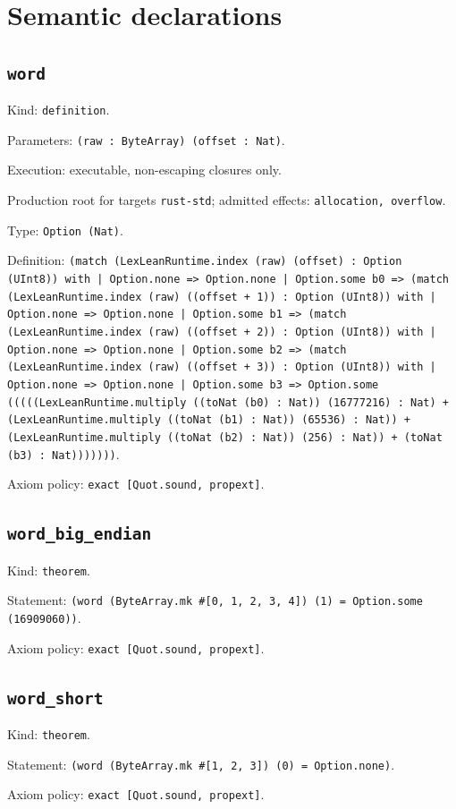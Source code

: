 \documentclass[11pt]{article}
\begin{document}
\section*{Semantic declarations}
\subsection*{\texttt{word}}
\noindent Kind: \texttt{definition}.\par
\noindent Parameters: \texttt{(raw : ByteArray) (offset : Nat)}.\par
\noindent Execution: executable, non-escaping closures only.\par
\noindent Production root for targets \texttt{rust-std}; admitted effects: \texttt{allocation, overflow}.\par
\noindent Type: \texttt{Option (Nat)}.\par
\noindent Definition: \texttt{(match (LexLeanRuntime.index (raw) (offset) : Option (UInt8)) with | Option.none => Option.none | Option.some b0 => (match (LexLeanRuntime.index (raw) ((offset + 1)) : Option (UInt8)) with | Option.none => Option.none | Option.some b1 => (match (LexLeanRuntime.index (raw) ((offset + 2)) : Option (UInt8)) with | Option.none => Option.none | Option.some b2 => (match (LexLeanRuntime.index (raw) ((offset + 3)) : Option (UInt8)) with | Option.none => Option.none | Option.some b3 => Option.some (((((LexLeanRuntime.multiply ((toNat (b0) : Nat)) (16777216) : Nat) + (LexLeanRuntime.multiply ((toNat (b1) : Nat)) (65536) : Nat)) + (LexLeanRuntime.multiply ((toNat (b2) : Nat)) (256) : Nat)) + (toNat (b3) : Nat)))))))}.\par
\noindent Axiom policy: \texttt{exact [Quot.sound, propext]}.\par
\subsection*{\texttt{word\_big\_endian}}
\noindent Kind: \texttt{theorem}.\par
\noindent Statement: \texttt{(word (ByteArray.mk \#[0, 1, 2, 3, 4]) (1) = Option.some (16909060))}.\par
\noindent Axiom policy: \texttt{exact [Quot.sound, propext]}.\par
\subsection*{\texttt{word\_short}}
\noindent Kind: \texttt{theorem}.\par
\noindent Statement: \texttt{(word (ByteArray.mk \#[1, 2, 3]) (0) = Option.none)}.\par
\noindent Axiom policy: \texttt{exact [Quot.sound, propext]}.\par
\end{document}
